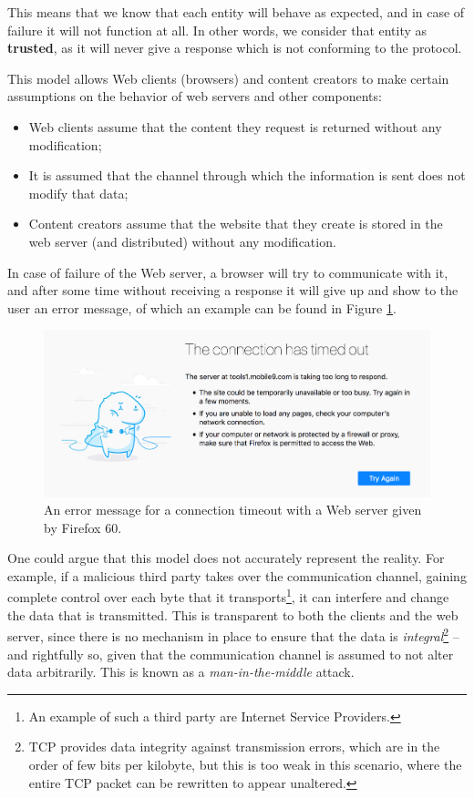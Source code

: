 \documentclass[mscthesis]{usiinfthesis}
\begin{document}
This means that we know that each entity will behave as expected, and in case of failure it will not function at all. In other words, we consider that entity as \textbf{trusted}, as it will never give a response which is not conforming to the protocol.

This model allows Web clients (browsers) and content creators to make certain assumptions on the behavior of web servers and other components:
\begin{itemize}
	\item Web clients assume that the content they request is returned without any modification;
	\item It is assumed that the channel through which the information is sent does not modify that data;
	\item Content creators assume that the website that they create is stored in the web server (and distributed) without any modification.
\end{itemize}
In case of failure of the Web server, a browser will try to communicate with it, and after some time without receiving a response it will give up and show to the user an error message, of which an example can be found in Figure \ref{fig:browsertimeoutexample}.
\begin{figure}[b]
	\centering
	\includegraphics[width=0.9\linewidth]{img/browser-timeout-example}
	\caption{An error message for a connection timeout with a Web server given by Firefox 60.}
	\label{fig:browsertimeoutexample}
\end{figure}

One could argue that this model does not accurately represent the reality. For example, if a malicious third party takes over the communication channel, gaining complete control over each byte that it transports\footnote{An example of such a third party are Internet Service Providers.}, it can interfere and change the data that is transmitted. This is transparent to both the clients and the web server, since there is no mechanism in place to ensure that the data is \textit{integral}\footnote{TCP provides data integrity against transmission errors, which are in the order of few bits per kilobyte, but this is too weak in this scenario, where the entire TCP packet can be rewritten to appear unaltered.} -- and rightfully so, given that the communication channel is assumed to not alter data arbitrarily. This is known as a \textit{man-in-the-middle} attack.
\end{document}
